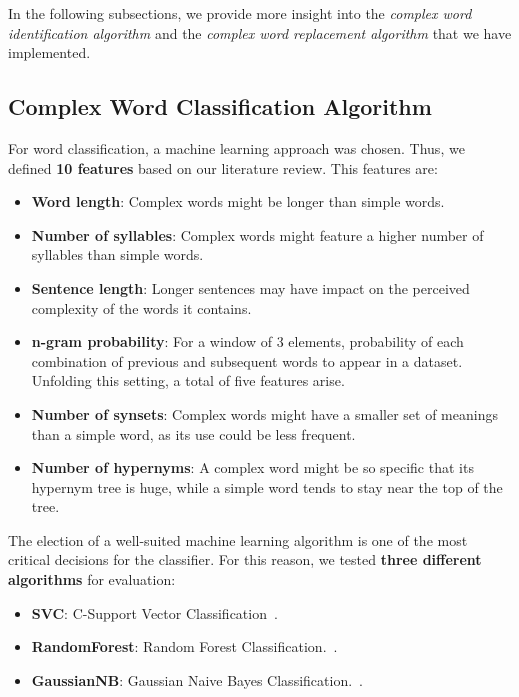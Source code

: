 \documentclass[11pt,a4paper]{article}
\begin{document}
In the following subsections, we provide more insight into the \emph{complex word identification algorithm} and the \emph{complex word replacement algorithm} that we have implemented.

\subsection{Complex Word Classification Algorithm}

For word classification, a machine learning approach was chosen. Thus, we defined \textbf{10 features} based on our literature review. This features are:

\begin{itemize}
	\item{\textbf{Word length}: Complex words might be longer than simple words.}
	\item{\textbf{Number of syllables}: Complex words might feature a higher number of syllables than simple words.}
	\item{\textbf{Sentence length}: Longer sentences may have impact on the perceived complexity of the words it contains.}
	\item{\textbf{n-gram probability}: For a window of 3 elements, probability of each combination of previous and subsequent words to appear in a dataset. Unfolding this setting, a total of five features arise.}
	\item{\textbf{Number of synsets}: Complex words might have a smaller set of meanings than a simple word, as its use could be less frequent.}
	\item{\textbf{Number of hypernyms}: A complex word might be so specific that its hypernym tree is huge, while a simple word tends to stay near the top of the tree.}
\end{itemize}

The election of a well-suited machine learning algorithm is one of the most critical decisions for the classifier. For this reason, we tested \textbf{three different algorithms} for evaluation:

\begin{itemize}
	\item{\textbf{SVC}: C-Support Vector Classification~\cite{chang2011libsvm}.}
	\item{\textbf{RandomForest}: Random Forest Classification.~\cite{ho1998random}.}
	\item{\textbf{GaussianNB}: Gaussian Naive Bayes Classification.~\cite{hand2001idiot}.}
\end{itemize}
\end{document}
